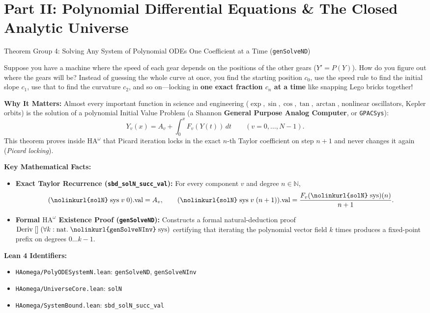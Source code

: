 \documentclass[11pt,a4paper]{article}
\newcommand{\HAomega}{\ensuremath{\mathrm{HA}^{\omega}}}
\newcommand{\Deriv}{\ensuremath{\mathrm{Deriv}}}
\newcommand{\N}{\ensuremath{\mathbb{N}}}
\newcommand{\lean}[1]{\texttt{\nolinkurl{#1}}}
\begin{document}
\newpage
\section{Part II: Polynomial Differential Equations \& The Closed Analytic Universe}

\begin{thmcard}{Theorem Group 4: Solving Any System of Polynomial ODEs One Coefficient at a Time (\lean{genSolveND})}
\begin{eli5box}
Suppose you have a machine where the speed of each gear depends on the positions of the other gears ($Y' = P(Y)$). How do you figure out where the gears will be? Instead of guessing the whole curve at once, you find the starting position $c_0$, use the speed rule to find the initial slope $c_1$, use that to find the curvature $c_2$, and so on---locking in \textbf{one exact fraction $c_n$ at a time} like snapping Lego bricks together!
\end{eli5box}

\textbf{Why It Matters:}
Almost every important function in science and engineering ($\exp, \sin, \cos, \tan, \arctan$, nonlinear oscillators, Kepler orbits) is the solution of a polynomial Initial Value Problem (a Shannon \textbf{General Purpose Analog Computer}, or \lean{GPACSys}):
\[
  Y_v(x) = A_v + \int_0^x F_v(Y(t))\,dt \qquad (v = 0, \dots, N-1).
\]
This theorem proves inside $\HAomega$ that Picard iteration locks in the exact $n$-th Taylor coefficient on step $n+1$ and never changes it again (\emph{Picard locking}).

\textbf{Key Mathematical Facts:}
\begin{itemize}
  \item \textbf{Exact Taylor Recurrence (\lean{sbd_solN_succ_val}):} For every component $v$ and degree $n \in \N$,
  \[
    (\lean{solN}\;\mathrm{sys}\;v\;0).\mathrm{val} = A_v, \qquad
    (\lean{solN}\;\mathrm{sys}\;v\;(n+1)).\mathrm{val} = \frac{F_v(\lean{solN}\;\mathrm{sys})(n)}{n+1}.
  \]
  \item \textbf{Formal $\HAomega$ Existence Proof (\lean{genSolveND}):} Constructs a formal natural-deduction proof $\Deriv\;[]\;(\forall k : \mathrm{nat}.\; \lean{genSolveNInv}\;\mathrm{sys})$ certifying that iterating the polynomial vector field $k$ times produces a fixed-point prefix on degrees $0 \dots k-1$.
\end{itemize}

\textbf{Lean 4 Identifiers:}
\begin{itemize}
  \item \lean{HAomega/PolyODESystemN.lean}: \lean{genSolveND}, \lean{genSolveNInv}
  \item \lean{HAomega/UniverseCore.lean}: \lean{solN}
  \item \lean{HAomega/SystemBound.lean}: \lean{sbd_solN_succ_val}
\end{itemize}
\end{thmcard}
\end{document}
